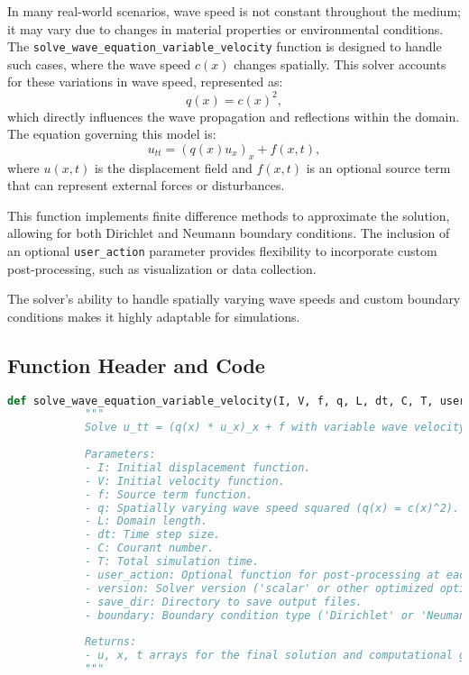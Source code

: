 \documentclass{article}
\begin{document}
		In many real-world scenarios, wave speed is not constant throughout the medium; it may vary due to changes in material properties or environmental conditions. The \texttt{solve\_wave\_equation\_variable\_velocity} function is designed to handle such cases, where the wave speed \( c(x) \) changes spatially. This solver accounts for these variations in wave speed, represented as:
		\[
		q(x) = c(x)^2,
		\]
		which directly influences the wave propagation and reflections within the domain. The equation governing this model is:
		\[
		u_{tt} = (q(x) u_x)_x + f(x, t),
		\]
		where \( u(x, t) \) is the displacement field and \( f(x, t) \) is an optional source term that can represent external forces or disturbances.
		
		This function implements finite difference methods to approximate the solution, allowing for both Dirichlet and Neumann boundary conditions. The inclusion of an optional \texttt{user\_action} parameter provides flexibility to incorporate custom post-processing, such as visualization or data collection.
		
		The solver’s ability to handle spatially varying wave speeds and custom boundary conditions makes it highly adaptable for simulations.
		
		\subsection{Function Header and Code}
		
		\begin{lstlisting}[language=Python]
			def solve_wave_equation_variable_velocity(I, V, f, q, L, dt, C, T, user_action=None, version='scalar', save_dir=None, boundary='Dirichlet'):
			"""
			Solve u_tt = (q(x) * u_x)_x + f with variable wave velocity q(x) = c(x)^2.
			
			Parameters:
			- I: Initial displacement function.
			- V: Initial velocity function.
			- f: Source term function.
			- q: Spatially varying wave speed squared (q(x) = c(x)^2).
			- L: Domain length.
			- dt: Time step size.
			- C: Courant number.
			- T: Total simulation time.
			- user_action: Optional function for post-processing at each time step.
			- version: Solver version ('scalar' or other optimized options).
			- save_dir: Directory to save output files.
			- boundary: Boundary condition type ('Dirichlet' or 'Neumann').
			
			Returns:
			- u, x, t arrays for the final solution and computational grid.
			"""
		\end{lstlisting}
		
\end{document}
